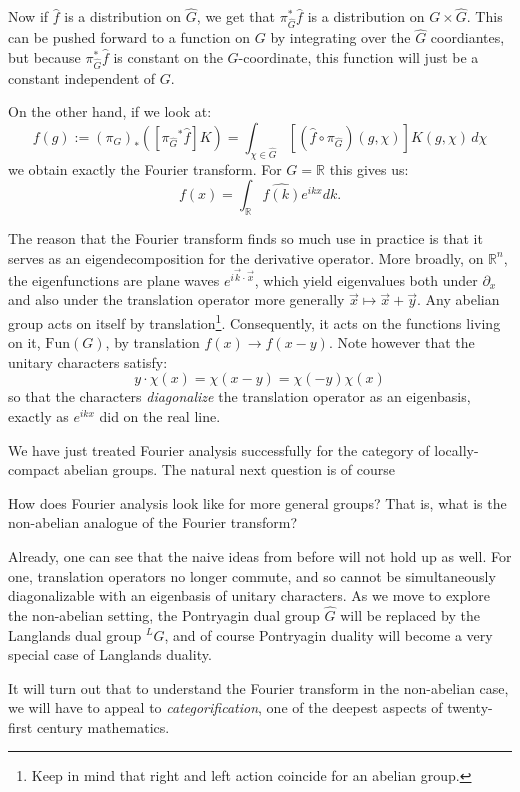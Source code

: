 		Now if $\hat f$ is a distribution on $\hat G$, we get that $\pi_{\hat G}^* \hat f$ is a distribution on $G \times \hat G$. This can be pushed forward to a function on $G$ by integrating over the $\hat G$ coordiantes, but because $\pi_{\hat G}^* \hat f$ is constant on the $G$-coordinate, this function will just be a constant independent of $G$.
		
		On the other hand, if we look at:
		\begin{equation}
			f (g) := {(\pi_{G})}_* ([{\pi_{\hat G}}^* \hat f] K) = \int_{\chi \in \hat G} [(\hat f \circ \pi_{\hat G}) (g, \chi)] K(g, \chi)\, d\chi
		\end{equation}
		we obtain exactly the Fourier transform. For $G = \mathbb R$ this gives us:
		\begin{equation}
			f(x) = \int_{\mathbb R} \widehat{f(k)} e^{ikx} dk.
		\end{equation}
		
		The reason that the Fourier transform finds so much use in practice is that it serves as an eigendecomposition for the derivative operator. More broadly, on $\mathbb R^n$, the eigenfunctions are plane waves $e^{i\vec k \cdot \vec x}$, which yield eigenvalues both under $\partial_x$ and also under the translation operator more generally $\vec x \mapsto \vec x + \vec y$. Any abelian group acts on itself by translation\footnote{Keep in mind that right and left action coincide for an abelian group.}. Consequently, it acts on the functions living on it, $\mathrm{Fun}(G)$, by translation $f(x) \to f(x - y)$. Note however that the unitary characters satisfy:
		\begin{equation}
			y \cdot \chi(x) = \chi(x - y) = \chi(-y) \chi(x)
		\end{equation}
		so that the characters \emph{diagonalize} the translation operator as an eigenbasis, exactly as $e^{ikx}$ did on the real line.
		
		We have just treated Fourier analysis successfully for the category of locally-compact abelian groups. The natural next question is of course
		\begin{ques}
			How does Fourier analysis look like for more general groups? That is, what is the non-abelian analogue of the Fourier transform?
		\end{ques}
		Already, one can see that the naive ideas from before will not hold up as well. For one, translation operators no longer commute, and so cannot be simultaneously diagonalizable with an eigenbasis of unitary characters. As we move to explore the non-abelian setting, the Pontryagin dual group $\hat G$ will be replaced by the Langlands dual group $^L G$, and of course Pontryagin duality will become a very special case of Langlands duality.
		
		It will turn out that to understand the Fourier transform in the non-abelian case, we will have to appeal to \emph{categorification}, one of the deepest aspects of twenty-first century mathematics.
